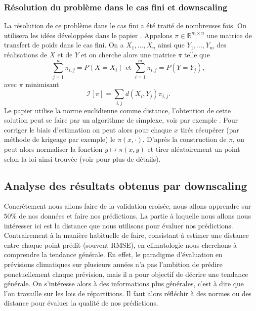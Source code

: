 \documentclass[a4paper,11pt]{article}
\begin{document}
\subsubsection{Résolution du problème dans le cas fini et downscaling}
La résolution de ce problème dans le cas fini a été traité de nombreuses fois. On utilisera les idées développées dans le papier \cite{robin2019multivariate}. Appelons $\pi \in \mathbb{R}^{m\times n}$ une matrice de transfert de poids dans le cas fini. On a $X_1,...,X_n$ ainsi que $Y_1,...,Y_m$ des réalisations de $X$ et de $Y$ et on cherche alors une matrice $\pi$ telle que 
\[\sum_{j=1}^{n} \pi_{i,j}= P(X=X_i) \textrm{ et } \sum_{i=1}^{m} \pi_{i,j}= P(Y=Y_j),\]
avec $\pi$ minimisant 
\[\mathcal{I}[\pi]=\sum_{i,j}d(X_i,Y_j)\pi_{i,j}.\]  
Le papier utilise la norme euclidienne comme distance, l'obtention de cette solution peut se faire par un algorithme de simplexe, voir par exemple \cite{huang2012optimal}. Pour corriger le biais d'estimation on peut alors pour chaque $x$ tirés récupérer (par méthode de krigeage par exemple) le $\pi(x,\cdot)$. D'après la construction de $\pi$, on peut alors normaliser la fonction $y\mapsto \pi(x,y)$ et tirer aléatoirement un point selon la loi ainsi trouvée (voir \cite{robin2019multivariate} pour plus de détails).




\subsection{Analyse des résultats obtenus par downscaling}
\label{analyse-pred}
Concrètement nous allons faire de la validation croisée, nous allons apprendre sur $50\%$ de nos données et faire nos prédictions. La partie à laquelle nous allons nous intéresser ici est la distance que nous utilisons pour évaluer nos prédictions. Contrairement à la manière habituelle de faire, consistant à estimer une distance entre chaque point prédit (souvent RMSE), en climatologie nous cherchons à comprendre la tendance générale. En effet, le paradigme d'évaluation en prévisions climatiques sur plusieurs années n'a pas l'ambition de prédire ponctuellement chaque prévision, mais il a pour objectif de décrire une tendance générale. On s'intéresse alors à des informations plus générales, c'est à dire que l'on travaille sur les lois de répartitions. Il faut alors réfléchir à des normes ou des distance pour évaluer la qualité de nos prédictions.  

\vspace{0.7cm}
\end{document}
